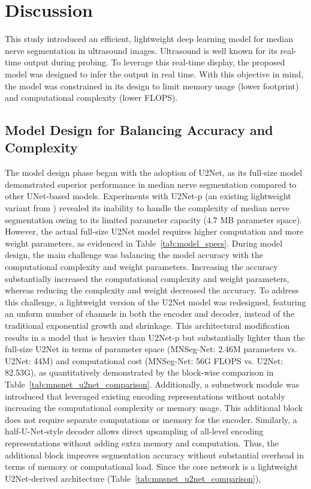 \section{Discussion}
This study introduced an efficient, lightweight deep learning model for median nerve segmentation in ultrasound images. Ultrasound is well known for its real-time output during probing. To leverage this real-time display, the proposed model was designed to infer the output in real time. With this objective in mind, the model was constrained in its design to limit memory usage (lower footprint) and computational complexity (lower FLOPS). 
\subsection{Model Design for Balancing Accuracy and Complexity} The model design phase began with the adoption of U2Net, as its full-size model demonstrated superior performance in median nerve segmentation compared to other UNet-based models. Experiments with U2Net-p (an existing lightweight variant from \cite{qin2020u2})   revealed its inability to handle the complexity of median nerve segmentation owing to its limited parameter capacity (4.7 MB parameter space). However, the actual full-size U2Net model requires higher computation and more weight parameters, as evidenced in Table~\ref{tab:model_specs}. During model design, the main challenge was balancing the model accuracy with the computational complexity and weight parameters. Increasing the accuracy substantially increased the computational complexity and weight parameters, whereas reducing the complexity and weight decreased the accuracy. To address this challenge, a lightweight version of the U2Net model was redesigned, featuring an unform number of channels in both the encoder and decoder, instead of the traditional exponential growth and shrinkage. This architectural modification
results in a model that is heavier than U2Net-p but substantially lighter than the full-size U2Net in terms of parameter space (MNSeg-Net: 2.46M parameters vs. U2Net: 44M) and computational cost (MNSeg-Net: 56G FLOPS vs. U2Net: 82.53G), as quantitatively demonstrated by the block-wise comparison in Table~\ref{tab:mnsnet_u2net_comparison}. Additionally, a subnetwork module was introduced that leveraged existing encoding representations without notably increasing the computational complexity or memory usage. This additional block does not require separate computations or memory for the encoder. Similarly, a half-U-Net-style decoder allows direct upsampling of all-level encoding representations without adding extra memory and computation. Thus, the additional block improves segmentation accuracy without substantial overhead in terms of memory or computational load. Since the core network is a lightweight U2Net-derived architecture (Table~\ref{tab:mnsnet_u2net_comparison}),
